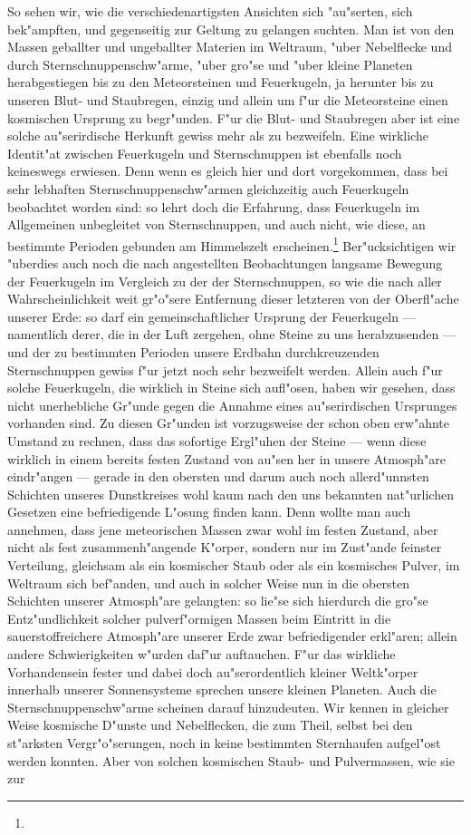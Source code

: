 \documentclass[a4paper, 8pt, oneside, polutonikogreek, german]{article}
\begin{document}
So sehen wir, wie die verschiedenartigsten Ansichten sich "au"serten, sich bek"ampften, und gegenseitig zur Geltung zu gelangen suchten. Man ist von den Massen geballter und ungeballter Materien im Weltraum, "uber Nebelflecke und durch Sternschnuppenschw"arme, "uber gro"se und "uber kleine Planeten herabgestiegen bis zu den Meteorsteinen und Feuerkugeln, ja herunter bis zu unseren Blut- und Staubregen, einzig und allein um f"ur die Meteorsteine einen kosmischen Ursprung zu begr"unden. F"ur die Blut- und Staubregen aber ist eine solche au"serirdische Herkunft gewiss mehr als zu bezweifeln. Eine wirkliche Identit"at zwischen Feuerkugeln und Sternschnuppen ist ebenfalls noch keineswegs erwiesen. Denn wenn es gleich hier und dort vorgekommen, dass bei sehr lebhaften Sternschnuppenschw"armen gleichzeitig auch Feuerkugeln beobachtet worden sind: so lehrt doch die Erfahrung, dass Feuerkugeln im Allgemeinen unbegleitet von Sternschnuppen, und auch nicht, wie diese, an bestimmte Perioden gebunden am Himmelszelt erscheinen.\footnote{} Ber"ucksichtigen wir "uberdies auch noch die nach angestellten Beobachtungen langsame Bewegung der Feuerkugeln im Vergleich zu der der Sternschnuppen, so wie die nach aller Wahrscheinlichkeit weit gr"o"sere Entfernung dieser letzteren von der Oberfl"ache unserer Erde: so darf ein gemeinschaftlicher Ursprung der Feuerkugeln --- namentlich derer, die in der Luft zergehen, ohne Steine zu uns herabzusenden --- und der zu bestimmten Perioden unsere Erdbahn durchkreuzenden Sternschnuppen gewiss f"ur jetzt noch sehr bezweifelt werden. Allein auch f"ur solche Feuerkugeln, die wirklich in Steine sich aufl"osen, haben wir gesehen, dass nicht unerhebliche Gr"unde gegen die Annahme eines au"serirdischen Ursprunges vorhanden sind. Zu diesen Gr"unden ist vorzugsweise der schon oben erw"ahnte Umstand zu rechnen, dass das sofortige Ergl"uhen der Steine --- wenn diese wirklich in einem bereits festen Zustand von au"sen her in unsere Atmosph"are eindr"angen --- gerade in den obersten und darum auch noch allerd"unnsten Schichten unseres Dunstkreises wohl kaum nach den uns bekannten nat"urlichen Gesetzen eine befriedigende L"osung finden kann. Denn wollte man auch annehmen, dass jene meteorischen Massen zwar wohl im festen Zustand, aber nicht als fest zusammenh"angende K"orper, sondern nur im Zust"ande feinster Verteilung, gleichsam als ein kosmischer Staub oder als ein kosmisches Pulver, im Weltraum sich bef"anden, und auch in solcher Weise nun in die obersten Schichten unserer Atmosph"are gelangten: so lie"se sich hierdurch die gro"se Entz"undlichkeit solcher pulverf"ormigen Massen beim Eintritt in die sauerstoffreichere Atmosph"are unserer Erde zwar befriedigender erkl"aren; allein andere Schwierigkeiten w"urden daf"ur auftauchen. F"ur das wirkliche Vorhandensein fester und dabei doch au"serordentlich kleiner Weltk"orper innerhalb unserer Sonnensysteme sprechen unsere kleinen Planeten. Auch die Sternschnuppenschw"arme scheinen darauf hinzudeuten. Wir kennen in gleicher Weise kosmische D"unste und Nebelflecken, die zum Theil, selbst bei den st"arksten Vergr"o"serungen, noch in keine bestimmten Sternhaufen aufgel"ost werden konnten. Aber von solchen kosmischen Staub- und Pulvermassen, wie sie zur 
\end{document}
